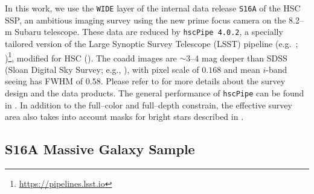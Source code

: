\documentclass[a4paper,fleqn,usenatbib]{mnras}
\begin{document}

	
	In this work, we use the \texttt{WIDE} layer of the internal data release 
	\texttt{S16A} of the HSC SSP, an ambitious imaging survey using the new prime focus 
	camera on the 8.2--m Subaru telescope. 
	These data are reduced by \texttt{hscPipe 4.0.2}, a specially tailored version of 
	the Large Synoptic Survey Telescope (LSST) pipeline (e.g.\ \citealt{Juric2015}; 
	\citealt{Axelrod2010})\footnote{\url{https://pipelines.lsst.io}}, 
	modified for HSC (\citealt{HSC-PIPE}).
	The coadd images are $\sim$3--4 mag deeper than SDSS (Sloan Digital Sky Survey; 
	e.g., \citealt{SDSS-DR7, SDSS-DR8, SDSS-DR12}), with pixel scale of 0\asec{}$.168$
	and mean $i$-band seeing has FWHM of 0\asec{}$.58$.
	Please refer to \citet{HSC-SSP, HSC-DR1} for more details about the survey design
	and the data products.
	The general performance of \texttt{hscPipe} can be found in \citet{SynPipe}.
	In addition to the full--color and full--depth constrain, the effective survey 
	area also takes into account masks for bright stars described in
	\citet{HSC-STAR}.


\subsection{S16A Massive Galaxy Sample}
    \label{sec:sample}	
\end{document}
